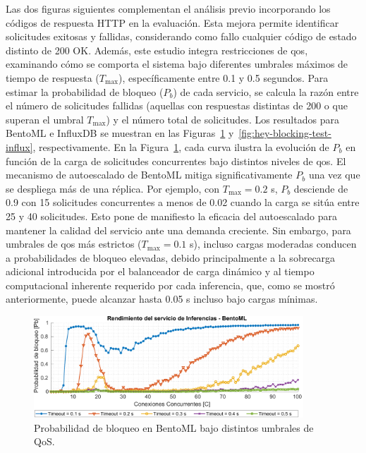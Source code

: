 Las dos figuras siguientes complementan el análisis previo incorporando los códigos de respuesta HTTP en la evaluación. Esta mejora permite identificar solicitudes exitosas y fallidas, considerando como fallo cualquier código de estado distinto de 200 OK. Además, este estudio integra restricciones de \gls{qos}, examinando cómo se comporta el sistema bajo diferentes umbrales máximos de tiempo de respuesta ($T_\text{max}$), específicamente entre 0.1 y 0.5 segundos. Para estimar la probabilidad de bloqueo ($P_b$) de cada servicio, se calcula la razón entre el número de solicitudes fallidas (aquellas con respuestas distintas de 200 o que superan el umbral $T_\text{max}$) y el número total de solicitudes. Los resultados para BentoML e InfluxDB se muestran en las Figuras~\ref{fig:hey-blocking-test-bento} y~\ref{fig:hey-blocking-test-influx}, respectivamente. En la Figura~\ref{fig:hey-blocking-test-bento}, cada curva ilustra la evolución de $P_b$ en función de la carga de solicitudes concurrentes bajo distintos niveles de \gls{qos}. El mecanismo de autoescalado de BentoML mitiga significativamente $P_b$ una vez que se despliega más de una réplica. Por ejemplo, con $T_\text{max} = 0.2$ s, $P_b$ desciende de 0.9 con 15 solicitudes concurrentes a menos de 0.02 cuando la carga se sitúa entre 25 y 40 solicitudes. Esto pone de manifiesto la eficacia del autoescalado para mantener la calidad del servicio ante una demanda creciente. Sin embargo, para umbrales de \gls{qos} más estrictos ($T_\text{max} = 0.1$ s), incluso cargas moderadas conducen a probabilidades de bloqueo elevadas, debido principalmente a la sobrecarga adicional introducida por el balanceador de carga dinámico y al tiempo computacional inherente requerido por cada inferencia, que, como se mostró anteriormente, puede alcanzar hasta 0.05 s incluso bajo cargas mínimas.

\begin{figure}[ht!]
    \centering
    \includegraphics[width=0.9\textwidth]{fig/08_datadriven/datadriven_14.pdf}
    \caption{Probabilidad de bloqueo en BentoML bajo distintos umbrales de QoS.}
    \label{fig:hey-blocking-test-bento}
\end{figure}

